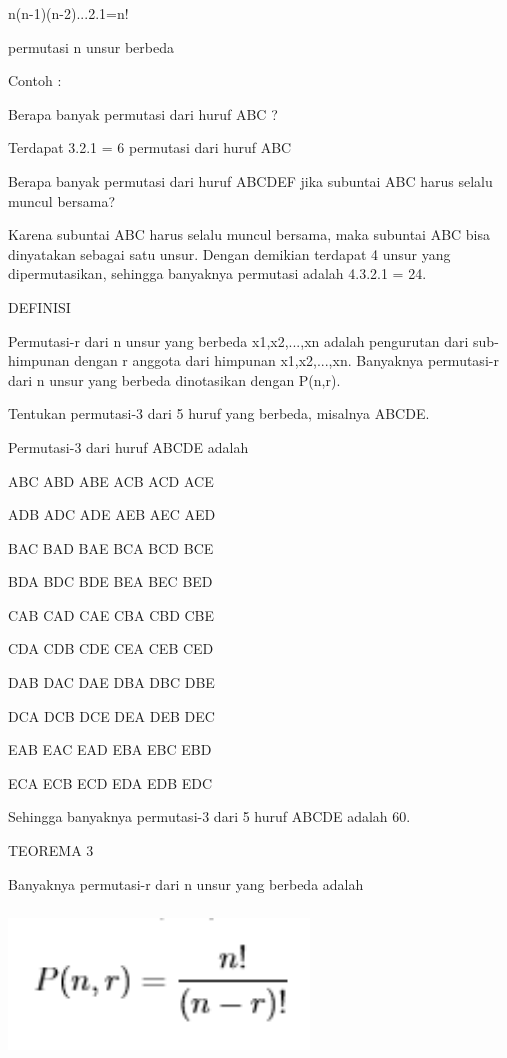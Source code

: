 \documentclass[11pt,fleqn]{book} %
\begin{document}
n(n-1)(n-2)...2.1=n!


permutasi n unsur berbeda

Contoh :


Berapa banyak permutasi dari huruf ABC ?


Terdapat 3.2.1 = 6 permutasi dari huruf ABC

Berapa banyak permutasi dari huruf ABCDEF jika subuntai ABC harus selalu muncul bersama?


Karena subuntai ABC harus selalu muncul bersama, maka subuntai ABC bisa dinyatakan sebagai satu unsur. Dengan demikian terdapat 4 unsur yang dipermutasikan, sehingga banyaknya permutasi adalah 4.3.2.1 = 24.

DEFINISI


Permutasi-r dari n unsur yang berbeda x1,x2,...,xn adalah pengurutan dari sub-himpunan dengan r anggota dari himpunan {x1,x2,...,xn}. Banyaknya permutasi-r dari n unsur yang berbeda dinotasikan dengan P(n,r).

Tentukan permutasi-3 dari 5 huruf yang berbeda, misalnya ABCDE.


Permutasi-3 dari huruf ABCDE adalah

ABC ABD ABE ACB ACD ACE 

ADB ADC ADE AEB AEC AED

BAC BAD BAE BCA BCD BCE 

BDA BDC BDE BEA BEC BED 

CAB CAD CAE CBA CBD CBE 

CDA CDB CDE CEA CEB CED 

DAB DAC DAE DBA DBC DBE 

DCA DCB DCE DEA DEB DEC 

EAB EAC EAD EBA EBC EBD 

ECA ECB ECD EDA EDB EDC

Sehingga banyaknya permutasi-3 dari 5 huruf ABCDE adalah 60.


TEOREMA 3

Banyaknya permutasi-r dari n unsur yang berbeda adalah

\includegraphics[width = 8cm, height= 4cm]{Pictures/herlin1.png}
\end{document}
